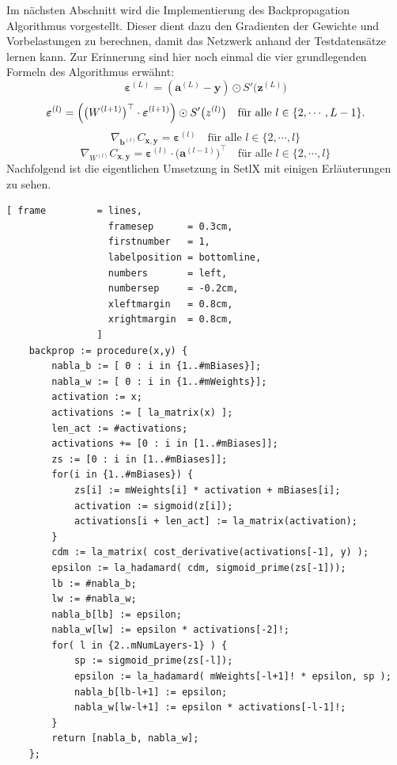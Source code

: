\noindent
Im nächsten Abschnitt wird die Implementierung des Backpropagation Algorithmus vorgestellt. Dieser dient dazu den Gradienten der Gewichte und Vorbelastungen zu berechnen, damit das Netzwerk anhand der Testdatensätze lernen kann. Zur Erinnerung sind hier noch einmal die vier grundlegenden Formeln des Algorithmus erwähnt:
\begin{equation} \label{eq:BP1_impl}
	\boldsymbol{\varepsilon}^{(L)} = (\mathbf{a}^{(L)} - \mathbf{y}) \odot S'\bigl(\mathbf{z}^{(L)}\bigr)  
\end{equation}
\begin{equation} \label{eq:BP2_impl}
	\boldsymbol{\varepsilon}^{(l)} = \Bigl(\bigl(W^{(l+1)}\bigr)^\top \cdot \boldsymbol{\varepsilon}^{(l+1)}\Bigr) \odot
  S'\bigl(z^{(l)}\bigr) \quad \mbox{für alle $l \in \{2, \cdots, L-1\}$}.
\end{equation}
\begin{equation} \label{eq:BP3_impl}
	\nabla_{\mathbf{b}^{(l)}} C_{\mathbf{x}, \mathbf{y}} = \boldsymbol{\varepsilon}^{(l)}
  \quad \mbox{für alle $l \in \{2, \cdots,l\}$}
\end{equation}
\begin{equation} \label{eq:BP4_impl}
	\nabla_{W^{(l)}} C_{\mathbf{x}, \mathbf{y}} = \boldsymbol{\varepsilon}^{(l)} \cdot \bigl(\mathbf{a}^{(l-1)}\bigr)^\top
  \quad \mbox{für alle $l \in \{2, \cdots,l\}$}
\end{equation}
Nachfolgend ist die eigentlichen Umsetzung in SetlX mit einigen Erläuterungen zu sehen.
\begin{Verbatim}[ frame         = lines, 
                  framesep      = 0.3cm, 
                  firstnumber   = 1,
                  labelposition = bottomline,
                  numbers       = left,
                  numbersep     = -0.2cm,
                  xleftmargin   = 0.8cm,
                  xrightmargin  = 0.8cm,
                ]
    backprop := procedure(x,y) {
        nabla_b := [ 0 : i in {1..#mBiases}];
        nabla_w := [ 0 : i in {1..#mWeights}];
        activation := x;
        activations := [ la_matrix(x) ];
        len_act := #activations;
        activations += [0 : i in [1..#mBiases]];
        zs := [0 : i in [1..#mBiases]];		
        for(i in {1..#mBiases}) {
            zs[i] := mWeights[i] * activation + mBiases[i];	
            activation := sigmoid(z[i]);
            activations[i + len_act] := la_matrix(activation);
        }
        cdm := la_matrix( cost_derivative(activations[-1], y) );
        epsilon := la_hadamard( cdm, sigmoid_prime(zs[-1]));
        lb := #nabla_b;
        lw := #nabla_w;
        nabla_b[lb] := epsilon;	
        nabla_w[lw] := epsilon * activations[-2]!;				
        for( l in {2..mNumLayers-1} ) {
            sp := sigmoid_prime(zs[-l]);	
            epsilon := la_hadamard( mWeights[-l+1]! * epsilon, sp );
            nabla_b[lb-l+1] := epsilon;
            nabla_w[lw-l+1] := epsilon * activations[-l-1]!;
        }
        return [nabla_b, nabla_w];
    };
\end{Verbatim}
